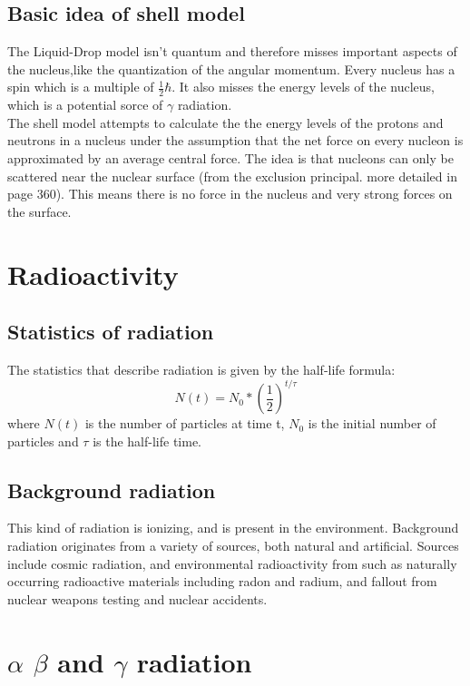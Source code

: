 \documentclass[]{article}
\begin{document}
\subsection{Basic idea of shell model}

The Liquid-Drop model isn't quantum and therefore misses important aspects of the nucleus,like the quantization of the angular momentum. Every nucleus has a spin which is a multiple of $\frac{1}{2}\hbar$. It also misses the energy levels of the nucleus, which is a potential sorce of $\gamma$ radiation.\\
The shell model attempts to calculate the the energy levels of the protons and neutrons in a nucleus under the assumption that the net force on every nucleon is approximated by an average central force. The idea is that nucleons can only be scattered near the nuclear surface (from the exclusion principal. more detailed in page 360). This means there is no force in the nucleus and very strong forces on the surface.

\section{Radioactivity}
\subsection{Statistics of radiation}

The statistics that describe radiation is given by the half-life formula: $$N(t)=N_0*(\frac{1}{2})^{t/\tau}$$ where $N(t)$ is the number of particles at time t, $N_0$ is the initial number of particles and $\tau$ is the half-life time.

\subsection{Background radiation}

This kind of radiation is ionizing, and is present in the environment. Background radiation originates from a variety of sources, both natural and artificial. Sources include cosmic radiation, and environmental radioactivity from such as naturally occurring radioactive materials including radon and radium, and fallout from nuclear weapons testing and nuclear accidents.

\section{$\alpha$ $\beta$ and $\gamma$ radiation}
\end{document}
